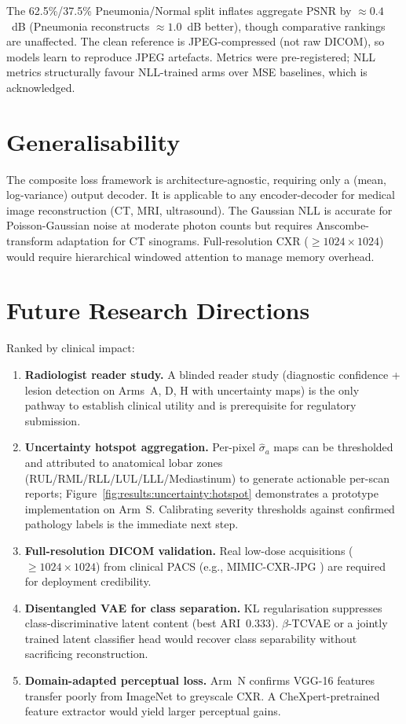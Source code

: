 \documentclass[12pt, a4paper, twoside, openright]{book}
\begin{document}
The 62.5\%/37.5\% Pneumonia/Normal split inflates aggregate PSNR by $\approx 0.4$~dB (Pneumonia reconstructs $\approx 1.0$~dB better), though comparative rankings are unaffected. The clean reference is JPEG-compressed (not raw DICOM), so models learn to reproduce JPEG artefacts. Metrics were pre-registered; NLL metrics structurally favour NLL-trained arms over MSE baselines, which is acknowledged.

\section{Generalisability}
\label{sec:disc:generalisability}

The composite loss framework is architecture-agnostic, requiring only a (mean, log-variance) output decoder. It is applicable to any encoder-decoder for medical image reconstruction (CT, MRI, ultrasound). The Gaussian NLL is accurate for Poisson-Gaussian noise at moderate photon counts but requires Anscombe-transform adaptation for CT sinograms. Full-resolution CXR ($\geq 1024\times1024$) would require hierarchical windowed attention to manage memory overhead.

\section{Future Research Directions}
\label{sec:disc:future}

Ranked by clinical impact:

\begin{enumerate}
  \item \textbf{Radiologist reader study.} A blinded reader study (diagnostic confidence + lesion detection on Arms~A, D, H with uncertainty maps) is the only pathway to establish clinical utility and is prerequisite for regulatory submission.

  \item \textbf{Uncertainty hotspot aggregation.} Per-pixel $\hat{\sigma}_a$ maps can be thresholded and attributed to anatomical lobar zones (RUL/RML/RLL/LUL/LLL/Mediastinum) to generate actionable per-scan reports; Figure~\ref{fig:results:uncertainty:hotspot} demonstrates a prototype implementation on Arm~S. Calibrating severity thresholds against confirmed pathology labels is the immediate next step.

  \item \textbf{Full-resolution DICOM validation.} Real low-dose acquisitions ($\geq1024\times1024$) from clinical PACS (e.g., MIMIC-CXR-JPG \cite{johnson_mimic_2019}) are required for deployment credibility.

  \item \textbf{Disentangled VAE for class separation.} KL regularisation suppresses class-discriminative latent content (best ARI~$0.333$). $\beta$-TCVAE or a jointly trained latent classifier head would recover class separability without sacrificing reconstruction.

  \item \textbf{Domain-adapted perceptual loss.} Arm~N confirms VGG-16 features transfer poorly from ImageNet to greyscale CXR. A CheXpert-pretrained feature extractor would yield larger perceptual gains.
\end{enumerate}
\end{document}
